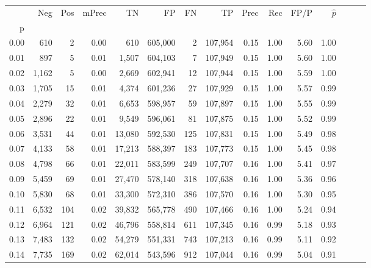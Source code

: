 \begin{tabular}{rrrrrrrrrrrrrrr}
\toprule
{} &     Neg &    Pos & mPrec &       TN &       FP &       FN &       TP &  Prec &   Rec &  FP/P & $\hat{p}$ \\
p    &         &        &       &          &          &          &          &       &       &       &           \\
\midrule
0.00 &     610 &      2 &  0.00 &      610 &  605,000 &        2 &  107,954 &  0.15 &  1.00 &  5.60 &      1.00 \\
0.01 &     897 &      5 &  0.01 &    1,507 &  604,103 &        7 &  107,949 &  0.15 &  1.00 &  5.60 &      1.00 \\
0.02 &   1,162 &      5 &  0.00 &    2,669 &  602,941 &       12 &  107,944 &  0.15 &  1.00 &  5.59 &      1.00 \\
0.03 &   1,705 &     15 &  0.01 &    4,374 &  601,236 &       27 &  107,929 &  0.15 &  1.00 &  5.57 &      0.99 \\
0.04 &   2,279 &     32 &  0.01 &    6,653 &  598,957 &       59 &  107,897 &  0.15 &  1.00 &  5.55 &      0.99 \\
0.05 &   2,896 &     22 &  0.01 &    9,549 &  596,061 &       81 &  107,875 &  0.15 &  1.00 &  5.52 &      0.99 \\
0.06 &   3,531 &     44 &  0.01 &   13,080 &  592,530 &      125 &  107,831 &  0.15 &  1.00 &  5.49 &      0.98 \\
0.07 &   4,133 &     58 &  0.01 &   17,213 &  588,397 &      183 &  107,773 &  0.15 &  1.00 &  5.45 &      0.98 \\
0.08 &   4,798 &     66 &  0.01 &   22,011 &  583,599 &      249 &  107,707 &  0.16 &  1.00 &  5.41 &      0.97 \\
0.09 &   5,459 &     69 &  0.01 &   27,470 &  578,140 &      318 &  107,638 &  0.16 &  1.00 &  5.36 &      0.96 \\
0.10 &   5,830 &     68 &  0.01 &   33,300 &  572,310 &      386 &  107,570 &  0.16 &  1.00 &  5.30 &      0.95 \\
0.11 &   6,532 &    104 &  0.02 &   39,832 &  565,778 &      490 &  107,466 &  0.16 &  1.00 &  5.24 &      0.94 \\
0.12 &   6,964 &    121 &  0.02 &   46,796 &  558,814 &      611 &  107,345 &  0.16 &  0.99 &  5.18 &      0.93 \\
0.13 &   7,483 &    132 &  0.02 &   54,279 &  551,331 &      743 &  107,213 &  0.16 &  0.99 &  5.11 &      0.92 \\
0.14 &   7,735 &    169 &  0.02 &   62,014 &  543,596 &      912 &  107,044 &  0.16 &  0.99 &  5.04 &      0.91 \\

\end{tabular}
